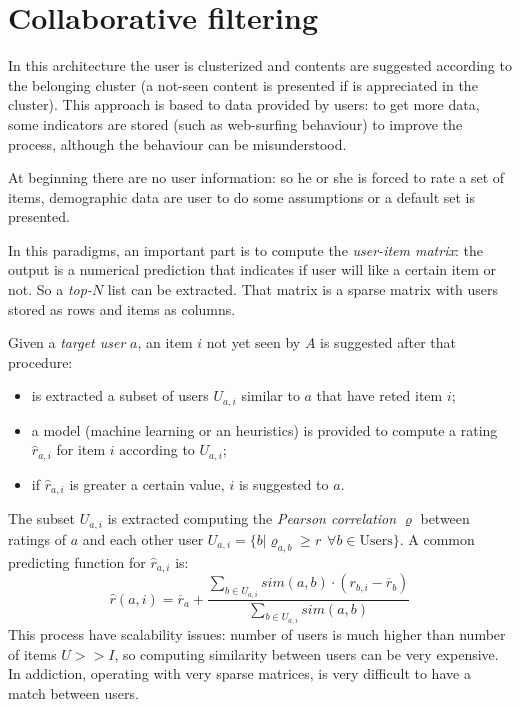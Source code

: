 \documentclass[11pt, a4page]{article}
\begin{document}
\section{Collaborative filtering}
In this architecture the user is clusterized and contents are suggested according to the belonging cluster (a not-seen content is presented if is appreciated in the cluster).
This approach is based to data provided by users: to get more data, some indicators are stored (such as web-surfing behaviour) to improve the process, although the behaviour can be misunderstood.

At beginning there are no user information: so he or she is forced to rate a set of items, demographic data are user to do some assumptions or a default set is presented.

In this paradigms, an important part is to compute the \textit{user-item matrix}: the output is a numerical prediction that indicates if user will like a certain item or not.
So a \textit{top-}$N$ list can be extracted.
That matrix is a sparse matrix with users stored as rows and items as columns.

Given a \textit{target user} $a$, an item $i$ not yet seen by $A$ is suggested after that procedure:
\begin{itemize}[noitemsep]
\item is extracted a subset of users $U_{a, i}$ similar to $a$ that have reted item $i$;
\item a model (machine learning or an heuristics) is provided to compute a rating $\hat{r}_{a, i}$ for item $i$ according to $U_{a, i}$;
\item if $\hat{r}_{a, i}$ is greater a certain value, $i$ is suggested to $a$.
\end{itemize}

The subset $U_{a, i}$ is extracted computing the \textit{Pearson correlation} $\varrho$ between ratings of $a$ and each other user $U_{a, i} = \{ b | \varrho_{a, b} \geq r \hspace{5pt} \forall b \in \text{Users} \}$.
A common predicting function for $\hat{r}_{a, i}$ is:
\begin{equation*}
  \hat{r}(a, i) = \overline{r}_a + \frac{\sum_{b \in U_{a, i}} sim(a, b) \cdot (r_{b, i} - \overline{r}_b)}{\sum_{b \in U_{a, i}} sim(a, b)}
\end{equation*}
This process have scalability issues: number of users is much higher than number of items $U >> I$, so computing similarity between users can be very expensive.
In addiction, operating with very sparse matrices, is very difficult to have a match between users.
\end{document}
